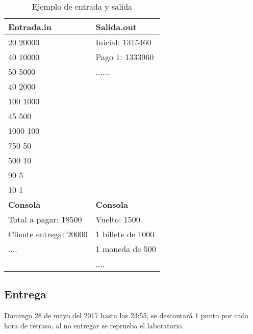 \documentclass[9pt,twocolumn,twoside]{optica}
\begin{document}
\begin{table}[]
\centering
\caption{Ejemplo de entrada y salida }
\label{my-label}
\begin{tabular}{|l|l|l|l|}
\hline
\multicolumn{2}{|l|}{\textbf{Entrada.in}} & \multicolumn{2}{l|}{\textbf{Salida.out}} \\ \hline
\multicolumn{2}{|l|}{20 20000}   & \multicolumn{2}{l|}{Inicial: 1315460}           \\ \hline
\multicolumn{2}{|l|}{40 10000}   & \multicolumn{2}{l|}{Pago 1: 1333960}           \\ \hline
\multicolumn{2}{|l|}{50 5000}   & \multicolumn{2}{l|}{......}           \\ \hline
\multicolumn{2}{|l|}{40 2000}   & \multicolumn{2}{l|}{}           \\ \hline
\multicolumn{2}{|l|}{100 1000}   & \multicolumn{2}{l|}{}           \\ \hline
\multicolumn{2}{|l|}{45 500}   & \multicolumn{2}{l|}{}           \\ \hline
\multicolumn{2}{|l|}{1000 100}   & \multicolumn{2}{l|}{}           \\ \hline
\multicolumn{2}{|l|}{750 50}   & \multicolumn{2}{l|}{}           \\ \hline
\multicolumn{2}{|l|}{500 10}   & \multicolumn{2}{l|}{}           \\ \hline
\multicolumn{2}{|l|}{90 5}   & \multicolumn{2}{l|}{}           \\ \hline
\multicolumn{2}{|l|}{10 1}   & \multicolumn{2}{l|}{}           \\ \hline
\multicolumn{2}{|l|}{\textbf{Consola}}    & \multicolumn{2}{l|}{\textbf{Consola}}    \\ \hline
\multicolumn{2}{|l|}{Total a pagar: 18500}           & \multicolumn{2}{l|}{Vuelto: 1500}           \\ \hline
\multicolumn{2}{|l|}{Cliente entrega: 20000}           & \multicolumn{2}{l|}{1 billete de 1000}           \\ \hline
\multicolumn{2}{|l|}{....}           & \multicolumn{2}{l|}{1 moneda de 500}           \\ \hline
\multicolumn{2}{|l|}{}           & \multicolumn{2}{l|}{....}           \\ \hline
\end{tabular}
\end{table}

\subsection{Entrega}
Domingo 28 de mayo del 2017 hasta las 23:55, se descontará 1 punto
por cada hora de retraso, al no entregar se reprueba el laboratorio.
\end{document}
